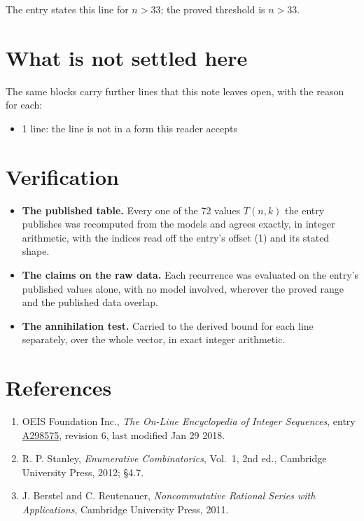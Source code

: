 \documentclass[11pt]{article}
\theoremstyle{definition}
\begin{document}
The entry states this line for $n > 33$; the proved threshold is $n > 33$.

\section{What is not settled here}

The same blocks carry further lines that this note leaves open, with the reason for each:

\begin{itemize}

\item 1 line: the line is not in a form this reader accepts

\end{itemize}

\section{Verification}

\begin{itemize}

\item {\bfseries The published table.} Every one of the 72 values $T(n,k)$ the entry publishes was recomputed from the models and agrees exactly, in integer arithmetic, with the indices read off the entry's offset (1) and its stated shape.

\item {\bfseries The claims on the raw data.} Each recurrence was evaluated on the entry's published values alone, with no model involved, wherever the proved range and the published data overlap.

\item {\bfseries The annihilation test.} Carried to the derived bound for each line separately, over the whole vector, in exact integer arithmetic.

\end{itemize}

\section{References}

\begin{enumerate}

\item OEIS Foundation Inc., \emph{The On-Line Encyclopedia of Integer Sequences}, entry \href{https://oeis.org/A298575}{A298575}, revision 6, last modified Jan 29 2018.

\item R. P. Stanley, \emph{Enumerative Combinatorics}, Vol.~1, 2nd ed., Cambridge University Press, 2012; \S4.7.

\item J. Berstel and C. Reutenauer, \emph{Noncommutative Rational Series with Applications}, Cambridge University Press, 2011.

\end{enumerate}
\end{document}
